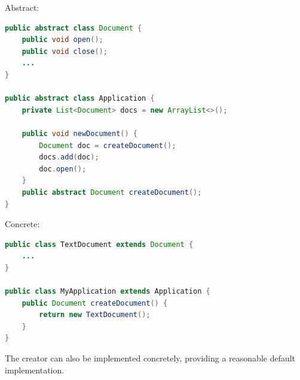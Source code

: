\documentclass[
    ../../Software_Engineering_Summary.tex,
]
{subfiles}
\begin{document}
\begin{codebox}
    \begin{minipage}
        [t]{0.5\textwidth}
        Abstract:
	\begin{lstlisting}[language=Java]
public abstract class Document {
    public void open();
    public void close();
    ...
}

public abstract class Application {
    private List<Document> docs = new ArrayList<>();

    public void newDocument() {
        Document doc = createDocument();
        docs.add(doc);
        doc.open();
    }
    public abstract Document createDocument();
}\end{lstlisting}
\end{minipage}
\hfill
\begin{minipage}
    [t]{0.5\textwidth}
    Concrete:
    \begin{lstlisting}[language=Java]
public class TextDocument extends Document {
    ...
}

public class MyApplication extends Application {
    public Document createDocument() {
        return new TextDocument();
    }
}
\end{lstlisting}
\end{minipage}
\end{codebox}

The creator can also be implemented concretely, providing a reasonable default implementation.
\end{document}

